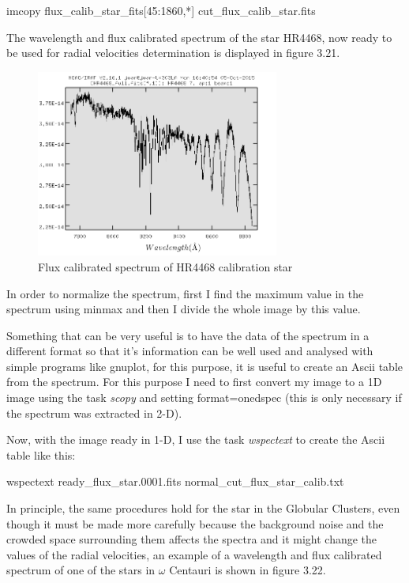 \begin{center}
imcopy flux\_calib\_star\_fits[45:1860,*] cut\_flux\_calib\_star.fits
\end{center}

The wavelength and flux calibrated spectrum of the star HR4468, now ready to be used for radial velocities determination is displayed in figure 3.21.

\begin{figure}[H]
\centering
\includegraphics[width=8cm]{images/calib_star_flux.png}
\caption[Flux calibrated spectrum of HR4468]{Flux calibrated spectrum of HR4468 calibration star}
\end{figure}

In order to normalize the spectrum, first I find the maximum value in the spectrum using minmax and then I divide the whole image by this value. 

Something that can be very useful is to have the data of the spectrum in a different format so that it's information can be well used and analysed with simple programs like gnuplot, for this purpose, it is useful to create an Ascii table from the spectrum. For this purpose I need to first convert my image to a 1D image using the task \textit{scopy} and setting format=onedspec (this is only necessary if the spectrum was extracted in 2-D).

Now, with the image ready in 1-D, I use the task \textit{wspectext} to create the Ascii table like this:

\begin{center}
wspectext ready\_flux\_star.0001.fits normal\_cut\_flux\_star\_calib.txt
\end{center}

In principle, the same procedures hold for the star in the Globular Clusters, even though it must be made more carefully because the background noise and the crowded space surrounding them affects the spectra and it might change the values of the radial velocities, an example of a wavelength and flux calibrated spectrum of one of the stars in $\omega$ Centauri is shown in figure 3.22.

